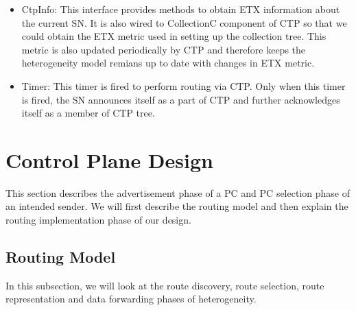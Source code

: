 \begin{enumerate}
\begin{itemize}
                \item CtpInfo: This interface provides methods to obtain \ac{ETX} information about the current \ac{SN}. It is also wired to CollectionC component of \ac{CTP} so that we could obtain the \ac{ETX} metric used in setting up the collection tree. This metric is also updated periodically by \ac{CTP} and therefore keeps the heterogeneity model remians up to date with changes in \ac{ETX} metric.
                
                \item Timer: This timer is fired to perform routing via \ac{CTP}. Only when this timer is fired, the \ac{SN} announces itself as a part of \ac{CTP} and further acknowledges itself as a member of \ac{CTP} tree. 
            \end{itemize}
    \end{enumerate}
        
\section{Control Plane Design } \label{sec:ControlPlaneDesign}
    
This section describes the advertisement phase of a \ac{PC} and \ac{PC} selection phase of an intended sender. We will first describe the routing model and then explain the routing implementation phase of our design.

    \subsection{Routing Model}
    
    In this subsection, we will look at the route discovery, route selection, route representation and data forwarding phases of heterogeneity.
    
